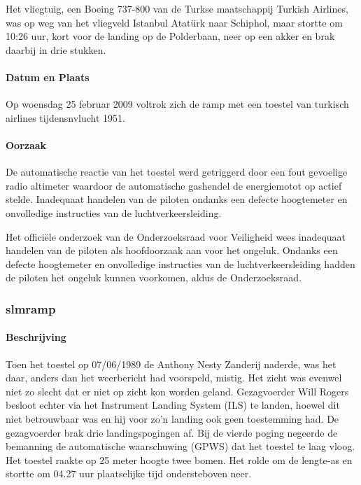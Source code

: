 \documentclass{article}
\begin{document}
	Het vliegtuig, een Boeing 737-800 van de Turkse maatschappij Turkish Airlines, was op weg van het vliegveld Istanbul Atatürk naar Schiphol, maar stortte om 10:26 uur,  kort voor de landing op de Polderbaan, neer op een akker en brak daarbij in drie stukken. 
	
	
	\paragraph{Datum en Plaats}
	
	\newline \indent  Op woensdag 25 februar 2009 voltrok zich de  ramp met een toestel van turkisch airlines tijdensnvlucht 1951.
	\paragraph{Oorzaak}
	De automatische reactie van het toestel werd getriggerd door een fout gevoelige radio altimeter waardoor de automatische gashendel de energiemotot op actief stelde.
	Inadequaat handelen van de piloten ondanks een defecte hoogtemeter en onvolledige instructies van de luchtverkeersleiding.
	
	Het officiële onderzoek van de Onderzoeksraad voor Veiligheid wees inadequaat handelen van de piloten als hoofdoorzaak aan voor het ongeluk. Ondanks een defecte hoogtemeter en onvolledige instructies van de luchtverkeersleiding hadden de piloten het ongeluk kunnen voorkomen, aldus de Onderzoeksraad.
	\subsubsection{slmramp}
	\paragraph{Beschrijving}
	Toen het toestel op 07/06/1989 de Anthony Nesty Zanderij naderde, was het daar, anders dan het weerbericht had voorspeld, mistig. Het zicht was evenwel niet zo slecht dat er niet op zicht kon worden geland. Gezagvoerder Will Rogers besloot echter via het Instrument Landing System (ILS) te landen, hoewel dit niet betrouwbaar was en hij voor zo'n landing ook geen toestemming had. De gezagvoerder brak drie landingspogingen af. Bij de vierde poging negeerde de bemanning de automatische waarschuwing (GPWS) dat het toestel te laag vloog. Het toestel raakte op 25 meter hoogte twee bomen. Het rolde om de lengte-as en stortte om 04.27 uur plaatselijke tijd ondersteboven neer.
\end{document}
